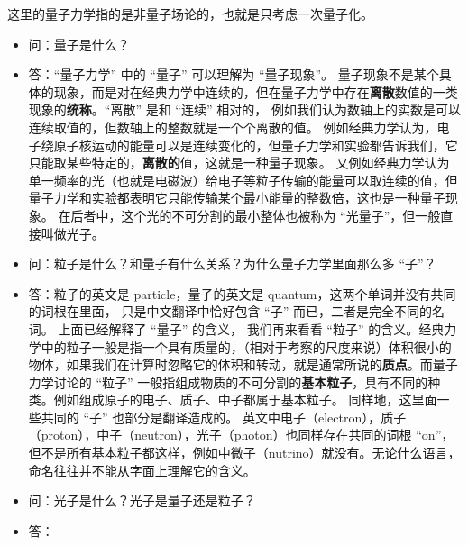 
\begin{issues}
\issueDraft
\end{issues}

这里的量子力学指的是非量子场论的，也就是只考虑一次量子化。

\begin{itemize}
\item  问：量子是什么？
\item 答：“量子力学” 中的 “量子” 可以理解为 “量子现象”。 量子现象不是某个具体的现象，而是对在经典力学中连续的，但在量子力学中存在\textbf{离散}数值的一类现象的\textbf{统称}。“离散” 是和 “连续” 相对的， 例如我们认为数轴上的实数是可以连续取值的，但数轴上的整数就是一个个离散的值。 例如经典力学认为，电子绕原子核运动的能量可以是连续变化的，但量子力学和实验都告诉我们，它只能取某些特定的，\textbf{离散的}值，这就是一种量子现象。 又例如经典力学认为单一频率的光（也就是电磁波）给电子等粒子传输的能量可以取连续的值，但量子力学和实验都表明它只能传输某个最小能量的整数倍，这也是一种量子现象。 在后者中，这个光的不可分割的最小整体也被称为 “光量子”，但一般直接叫做光子。

\item 问：粒子是什么？和量子有什么关系？为什么量子力学里面那么多 “子”？
\item 答：粒子的英文是 particle，量子的英文是 quantum，这两个单词并没有共同的词根在里面， 只是中文翻译中恰好包含 “子” 而已，二者是完全不同的名词。 上面已经解释了 “量子” 的含义， 我们再来看看 “粒子” 的含义。经典力学中的粒子一般是指一个具有质量的，（相对于考察的尺度来说）体积很小的物体，如果我们在计算时忽略它的体积和转动，就是通常所说的\textbf{质点}。而量子力学讨论的 “粒子” 一般指组成物质的不可分割的\textbf{基本粒子}，具有不同的种类。例如组成原子的电子、质子、中子都属于基本粒子。 同样地，这里面一些共同的 “子” 也部分是翻译造成的。 英文中电子（electron），质子（proton），中子（neutron），光子（photon）也同样存在共同的词根 “on”， 但不是所有基本粒子都这样，例如中微子（nutrino）就没有。无论什么语言，命名往往并不能从字面上理解它的含义。

\item 问：光子是什么？光子是量子还是粒子？
\item 答：




\end{itemize}
